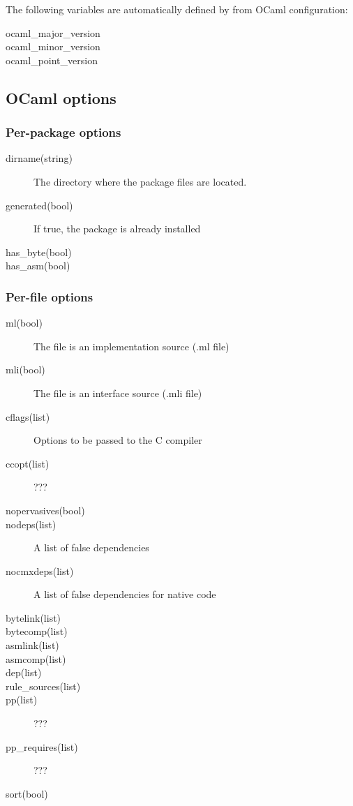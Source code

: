 The following variables are automatically defined by
\ocpbuild{} from OCaml configuration:
\begin{description}
\item[ocaml\_major\_version]
\item[ocaml\_minor\_version]
\item[ocaml\_point\_version]
\end{description}

\subsection{OCaml options}

\subsubsection{Per-package options}

\begin{description}
\item[dirname(string)] The directory where the package files are located.
\item[generated(bool)] If true, the package is already installed
\item[has\_byte(bool)]
\item[has\_asm(bool)]
\end{description}

\subsubsection{Per-file options}


\begin{description}
\item[ml(bool)] The file is an implementation source (.ml file)
\item[mli(bool)] The file is an interface source (.mli file)
\item[cflags(list)] Options to be passed to the C compiler
\item[ccopt(list)] ???
\item[nopervasives(bool)]
\item[nodeps(list)] A list of false dependencies
\item[nocmxdeps(list)] A list of false dependencies for native code
\item[bytelink(list)]
\item[bytecomp(list)]
\item[asmlink(list)]
\item[asmcomp(list)]
\item[dep(list)]
\item[rule\_sources(list)]
\item[pp(list)] ???
\item[pp\_requires(list)] ???
\item[sort(bool)]
\end{description}


